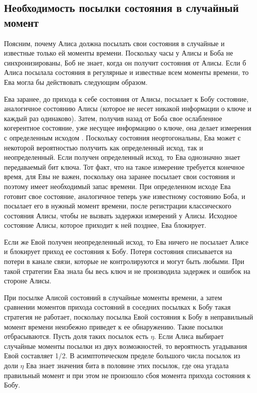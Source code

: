 \subsection{Необходимость посылки состояния в случайный момент}
Поясним, почему Алиса должна посылать свои состояния в случайные и известные только ей моменты времени. Поскольку часы у Алисы и Боба не синхронизированы, Боб не знает, когда он получит состояния от Алисы. Если б Алиса посылала состояния в регулярные и известные всем моменты времени, то Ева могла бы действовать следующим образом.

Ева заранее, до прихода к себе состояния от Алисы, посылает к Бобу состояние, аналогичное состоянию Алисы (которое не несет никакой информации о ключе и каждый раз одинаково). 
Затем, получив назад от Боба свое ослабленное когерентное состояние, уже несущее информацию о ключе, она делает измерения с определенным исходом \cite{scarani2009secpraquakeydis}. 
Поскольку состояния неортогональны, Ева может с некоторой вероятностью получить как определенный исход, так и неопределенный. 
Если получен определенный исход, то Ева однозначно знает передаваемый бит ключа. 
Тот факт, что на такое измерение требуется конечное время, для Евы не важен, поскольку она заранее посылает свои состояния и поэтому имеет необходимый запас времени. 
При определенном исходе Ева готовит свое состояние, аналогичное теперь уже известному состоянию Боба, и посылает его в нужный момент времени, после регистрации классического состояния Алисы, чтобы не вызвать задержки измерений у Алисы. 
Исходное состояние Алисы, которое приходит к ней позднее, Ева блокирует.

Если же Евой получен неопределенный исход, то Ева ничего не посылает Алисе и блокирует приход ее состояния к Бобу. 
Потеря состояния списывается на потери в канале связи, которые не контролируются и могут быть любыми. 
При такой стратегии Ева знала бы весь ключ и не производила задержек и ошибок на стороне Алисы.

При посылке Алисой состояний в случайные моменты времени, а затем сравнении моментов прихода состояний в соседних посылках к Бобу такая стратегия не работает, поскольку посылка Евой состояния к Бобу в неправильный момент времени неизбежно приведет к ее обнаружению.
Такие посылки отбрасываются. Пусть доля таких посылок есть $\eta$. Если Алиса выбирает случайные моменты посылки из двух возможностей, то вероятность угадывания Евой составляет 1/2. В асимптотическом пределе большого числа посылок из доли $\eta$ Ева знает значения бита в половине этих посылок, где она угадала правильный момент и при этом не произошло сбоя момента прихода состояния к Бобу.

